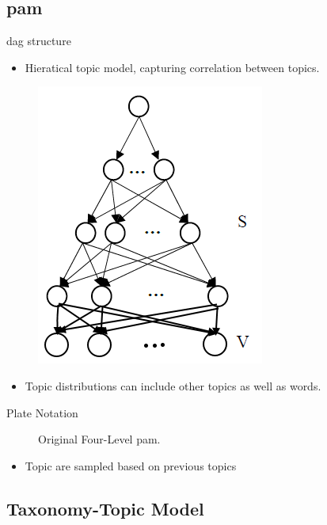 \subsection{\acrlong{pam}}

\begin{frame}{\insertsubsection}{\gls{dag} structure}
    \begin{itemize}
        \item Hieratical topic model, capturing correlation between topics.
    \end{itemize}
	
	\begin{figure}
		\centering
		\includegraphics[width=0.35 \textwidth]{../figures/pachinko_dag}
	\end{figure}
	
	\begin{itemize}
		\item Topic distributions can include other topics as well as words.
	\end{itemize}
\end{frame}

\begin{frame}{\insertsubsection}{Plate Notation}
	\begin{figure}
			\centering
			\resizebox{0.45\columnwidth}{!}{%
			
			}
			\caption{Original Four-Level \gls{pam}.}
	\end{figure}
	\begin{itemize}
		\item Topic are sampled based on previous topics
	\end{itemize}
\end{frame}

\subsection{Taxonomy-Topic Model}

